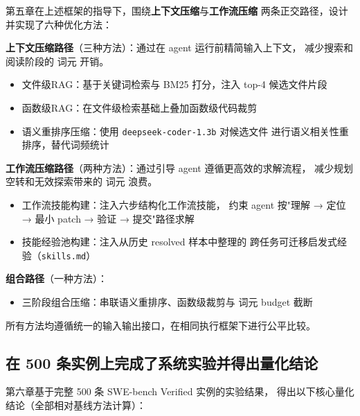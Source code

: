 第五章在上述框架的指导下，围绕\textbf{上下文压缩}与\textbf{工作流压缩}
两条正交路径，设计并实现了六种优化方法：

\textbf{上下文压缩路径}（三种方法）：通过在 agent 运行前精简输入上下文，
减少搜索和阅读阶段的 词元 开销。
\begin{itemize}
  \item 文件级RAG：基于关键词检索与 BM25 打分，注入 top-4 候选文件片段
  \item 函数级RAG：在文件级检索基础上叠加函数级代码裁剪
  \item 语义重排序压缩：使用 \texttt{deepseek-coder-1.3b} 对候选文件
        进行语义相关性重排序，替代词频统计
\end{itemize}

\textbf{工作流压缩路径}（两种方法）：通过引导 agent 遵循更高效的求解流程，
减少规划空转和无效探索带来的 词元 浪费。
\begin{itemize}
  \item 工作流技能构建：注入六步结构化工作流技能，
        约束 agent 按"理解 → 定位 → 最小 patch → 验证 → 提交"路径求解
  \item 技能经验池构建：注入从历史 resolved 样本中整理的
        跨任务可迁移启发式经验（\texttt{skills.md}）
\end{itemize}

\textbf{组合路径}（一种方法）：
\begin{itemize}
  \item 三阶段组合压缩：串联语义重排序、函数级裁剪与 词元 budget 截断
\end{itemize}

所有方法均遵循统一的输入输出接口，在相同执行框架下进行公平比较。

\subsection{在 500 条实例上完成了系统实验并得出量化结论}
\label{subsec:contribution-results}

第六章基于完整 500 条 SWE-bench Verified 实例的实验结果，
得出以下核心量化结论（全部相对基线方法计算）：

